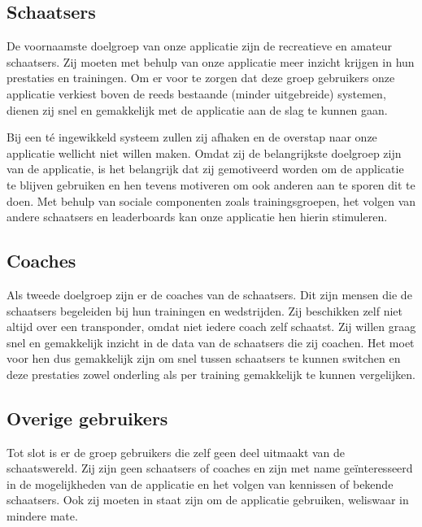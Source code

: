 \newcommand{\doelgroep}{}
\label{sec:doelgroep}

\subsection*{Schaatsers}
De voornaamste doelgroep van onze applicatie zijn de recreatieve en amateur schaatsers. Zij moeten met behulp van onze applicatie meer inzicht krijgen in hun prestaties en trainingen. 
Om er voor te zorgen dat deze groep gebruikers onze applicatie verkiest boven de reeds bestaande (minder uitgebreide) systemen, dienen zij snel en gemakkelijk met de applicatie aan de slag te kunnen gaan.

Bij een té ingewikkeld systeem zullen zij afhaken en de overstap naar onze applicatie wellicht niet willen maken.
Omdat zij de belangrijkste doelgroep zijn van de applicatie, is het belangrijk dat zij gemotiveerd worden om de applicatie te blijven gebruiken en hen tevens motiveren om ook anderen aan te sporen dit te doen.
Met behulp van sociale componenten zoals trainingsgroepen, het volgen van andere schaatsers en leaderboards kan onze applicatie hen hierin stimuleren.

\subsection*{Coaches}
Als tweede doelgroep zijn er de coaches van de schaatsers. Dit zijn mensen die de schaatsers begeleiden bij hun trainingen en wedstrijden. Zij beschikken zelf niet altijd over een transponder, omdat niet iedere coach zelf schaatst.
Zij willen graag snel en gemakkelijk inzicht in de data van de schaatsers die zij coachen. Het moet voor hen dus gemakkelijk zijn om snel tussen schaatsers te kunnen switchen en deze prestaties zowel onderling als per training gemakkelijk te kunnen vergelijken.

\subsection*{Overige gebruikers}
Tot slot is er de groep gebruikers die zelf geen deel uitmaakt van de schaatswereld. Zij zijn geen schaatsers of coaches en zijn met name geïnteresseerd in de mogelijkheden van de applicatie en het volgen van kennissen of bekende schaatsers.
Ook zij moeten in staat zijn om de applicatie gebruiken, weliswaar in mindere mate.